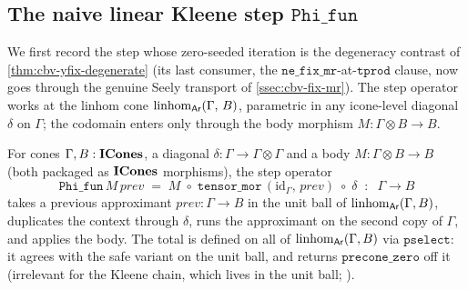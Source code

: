 \subsection{The naive linear Kleene step $\mathtt{Phi\_fun}$}%
\label{ssec:cbv-phifun}

We first record the step whose zero-seeded iteration is the degeneracy
contrast of \autoref{thm:cbv-yfix-degenerate} (its last consumer, the
$\mathtt{ne\_fix\_mr}$-at-$\mathtt{tprod}$ clause, now goes through
the genuine Seely transport of \autoref{ssec:cbv-fix-mr}). The step
operator works at the linhom
cone $\mathrm{linhom}_{\mathsf{Ar}}(\Gamma,\,B)$, parametric in any icone-level
diagonal $\delta$ on $\Gamma$; the codomain enters only through the
body morphism $M : \Gamma \otimes B \to B$.

\begin{definition}%
\label{def:cbv-phi-fun}
\rocqok
{}\rocqok
{}
For cones $\Gamma, B : \mathbf{ICones}$, a diagonal
$\delta : \Gamma \to \Gamma \otimes \Gamma$ and a body
$M : \Gamma \otimes B \to B$ (both packaged as $\mathbf{ICones}$ morphisms), the
step operator
\[
  \mathtt{Phi\_fun}\,M\,\mathit{prev}
  \;=\;
  M
    \;\circ\;
    \mathtt{tensor\_mor}\,(\mathrm{id}_\Gamma,\,\mathit{prev})
    \;\circ\;
    \delta
  \;\;:\;\;
  \Gamma \to B
\]
takes a previous approximant $\mathit{prev} : \Gamma \to B$ in the unit
ball of $\mathrm{linhom}_{\mathsf{Ar}}(\Gamma, B)$, duplicates the context through
$\delta$, runs the approximant on the second copy of $\Gamma$, and
applies the body. The total
 is defined on all of
$\mathrm{linhom}_{\mathsf{Ar}}(\Gamma, B)$ via $\mathtt{pselect}$: it agrees with the
safe variant
 on the unit ball, and
returns $\mathtt{precone\_zero}$ off it (irrelevant for the Kleene
chain, which lives in the unit ball;
).
\end{definition}

